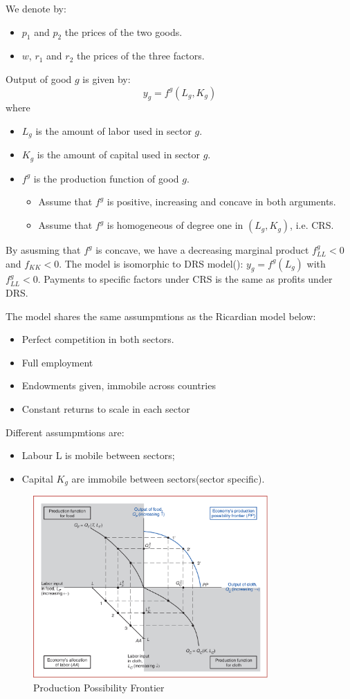 We denote by:
\begin{itemize}
    \item $p_1$ and $p_2$ the prices of the two goods.
    \item $w$, $r_1$ and $r_2$ the prices of the three factors.
\end{itemize}
Output of good $g$ is given by:
\begin{equation*}
    y_g = f^g(L_g, K_g)
\end{equation*}
where
\begin{itemize}
    \item $L_g$ is the amount of labor used in sector $g$.
    \item $K_g$ is the amount of capital used in sector $g$.
    \item $f^g$ is the production function of good $g$.
        \begin{itemize}
            \item Assume that $f^g$ is positive, increasing and concave in both arguments.
            \item Assume that $f^g$ is homogeneous of degree one in $(L_g, K_g)$, i.e. CRS.
        \end{itemize}
\end{itemize}
By asusming that $f^g$ is concave, we have a decreasing marginal product $f_{LL}^g < 0$ and $f_{KK} < 0$.
The model is isomorphic to DRS model(\cite{dornbusch1977comparative}): $y_g = f^g(L_g)$ with $f_{LL}^g < 0$.
Payments to specific factors under CRS is the same as profits under DRS.

The model shares the same assumpmtions as the Ricardian model below:
\begin{itemize}
    \item Perfect competition in both sectors.
    \item Full employment
    \item Endowments given, immobile across countries
    \item Constant returns to scale in each sector
\end{itemize}
Different assumpmtions are:
\begin{itemize}
    \item Labour L is mobile between sectors;
    \item Capital $K_g$ are immobile between sectors(sector specific).
\end{itemize}

\begin{figure}[htbp!]
    \centering
    \includegraphics[width=0.8\textwidth]{figures/SFM_PPF.png}
    \caption{Production Possibility Frontier}
    \label{fig:lec4-1}
\end{figure}
